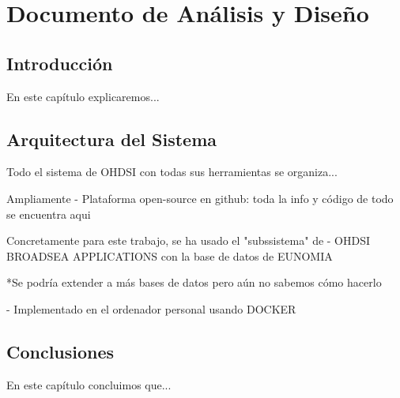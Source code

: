 \chapter{Documento de Análisis y Diseño}\label{cap:07diseño}

\section{Introducción}
En este capítulo explicaremos...

\section{Arquitectura del Sistema}

Todo el sistema de OHDSI con todas sus herramientas se organiza...

Ampliamente
- Plataforma open-source en github: toda la info y código de todo se encuentra aqui


Concretamente para este trabajo,
se ha usado el "subssistema" de
- OHDSI BROADSEA APPLICATIONS con la base de datos de EUNOMIA

*Se podría extender a más bases de datos pero aún no sabemos cómo hacerlo

- Implementado en el ordenador personal usando DOCKER










\section{Conclusiones}
En este capítulo concluimos que...
